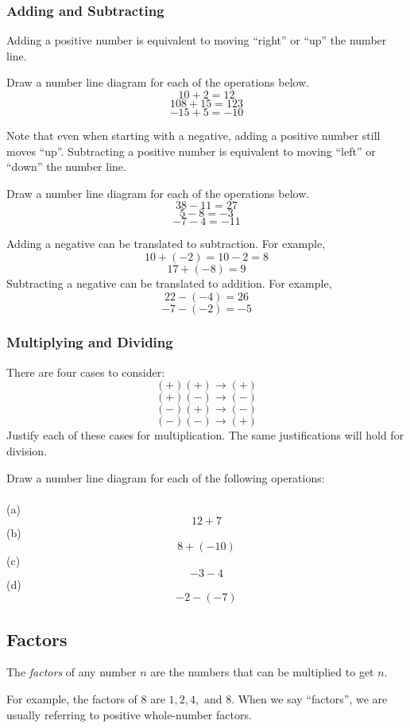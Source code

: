 \subsubsection{Adding and Subtracting} 
Adding a positive number is equivalent to moving ``right'' or ``up'' the number line.  
\begin{exercise}
Draw a number line diagram for each of the operations below. 
	\[10 + 2 = 12  \]
	\[ 108 + 15 = 123  \]
	\[  -15 + 5 = -10   \]
\end{exercise}
Note that even when starting with a negative, adding a positive number still moves ``up''. 
Subtracting a positive number is equivalent to moving ``left'' or ``down'' the number line. 
\begin{exercise}
	Draw a number line diagram for each of the operations below. 
	\[ 38 - 11 = 27 \]
	\[  5-8 = -3  \]
	\[  -7 - 4 = -11   \]
\end{exercise}
Adding a negative can be translated to subtraction.  For example, 
\[10 + (-2) = 10 -2 = 8 \]
\[  17 + (-8) = 9 \]
Subtracting a negative can be translated to addition.  For example, 
\[  22 - (-4) = 26 \]
\[ -7 - (-2) = -5 \]


\newpage 
\subsubsection{Multiplying and Dividing} 
There are four cases to consider: 
\[ (+)(+) \to (+)  \]
\[ (+)(-) \to (-)  \]
\[ (-)(+) \to (-)  \]
\[ (-)(-) \to (+)  \]
Justify each of these cases for multiplication.  The same justifications will hold for division.  


\begin{exercise}
	Draw a number line diagram for each of the following operations:   \\ \\
(a)	\[  12 + 7  \]    
(b)	\[  8 + (-10) \]  
(c)	\[  -3 - 4  \]
(d)	\[  -2 - (-7)    \]

\end{exercise}



\newpage 
\subsection{Factors}
\begin{definition}[Factor]
The \emph{factors} of any number \(n\) are the numbers that can be multiplied to get \(n\).  

For example, the factors of \(8\) are \(1, 2, 4, \text{ and } 8\). When we say ``factors'', we are usually referring to positive whole-number factors. 
\end{definition}

